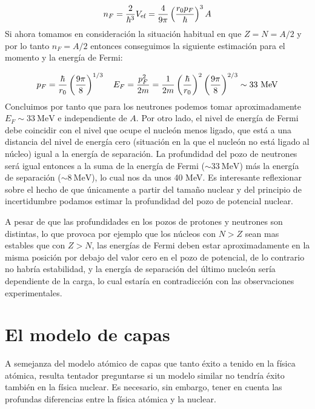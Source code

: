 \begin{eqnarray}
	n_F = \frac{2}{\hbar^3}V_{\text{ef}} = \frac{4}{9\pi} \left( \frac{r_0 p_F}{\hbar} \right)^3 A
\end{eqnarray}
Si ahora tomamos en consideración la situación habitual en que $Z=N=A/2$ y por lo tanto $n_F=A/2$ entonces conseguimos la siguiente estimación para el momento y la energía de Fermi:

\begin{eqnarray}
	p_F = \frac{\hbar}{r_0} \parentesis{\frac{9\pi}{8}}^{1/3} \quad E_F = \frac{p_F^2}{2m} = \frac{1}{2m} \parentesis{\frac{\hbar}{r_0}}^2 \parentesis{\frac{9\pi}{8}}^{2/3} \sim 33\ \unit{\MeV}
\end{eqnarray}
Concluimos por tanto que para los neutrones podemos tomar aproximadamente $E_F\sim 33 \ \unit{\MeV}$ e independiente de $A$. Por otro lado, el nivel de energía de Fermi debe coincidir con el nivel que ocupe el nucleón menos ligado, que está a una distancia del nivel de energía cero (situación en la que el nucleón no está ligado al núcleo) igual a la energía de separación. La profundidad del pozo de neutrones será igual entonces a la suma de la energía de Fermi ($\sim 33 \ \unit{\MeV}$) más la energía de separación ($\sim 8 \ \unit{\MeV}$), lo cual nos da unos 40 MeV. Es interesante reflexionar sobre el hecho de que únicamente a partir del tamaño nuclear y del principio de incertidumbre podamos estimar la profundidad del pozo de potencial nuclear. 


A pesar de que las profundidades en los pozos de protones y neutrones son distintas, lo que provoca por ejemplo que los núcleos con $N>Z$ sean mas estables que con $Z>N$, las energías de Fermi deben estar aproximadamente en la misma posición por debajo del valor cero en el pozo de potencial, de lo contrario no habría estabilidad, y la energía de separación del último nucleón sería dependiente de la carga, lo cual estaría en contradicción con las observaciones experimentales.





\section{El modelo de capas}

A semejanza del modelo atómico de capas que tanto éxito a tenido en la física atómica, resulta tentador preguntarse si un modelo similar no tendría éxito también en la física nuclear. Es necesario, sin embargo, tener en cuenta las profundas diferencias entre la física atómica y la nuclear. 

